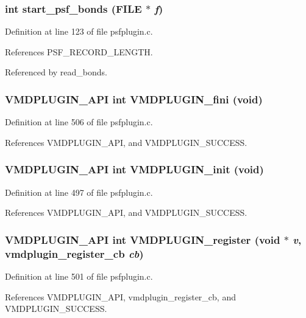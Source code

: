 \subsubsection{\setlength{\rightskip}{0pt plus 5cm}int start\_\-psf\_\-bonds (FILE $\ast$ {\em f})\hspace{0.3cm}{\tt  [static]}}\label{psfplugin_8c_a3}




Definition at line 123 of file psfplugin.c.

References PSF\_\-RECORD\_\-LENGTH.

Referenced by read\_\-bonds.
\subsubsection{\setlength{\rightskip}{0pt plus 5cm}VMDPLUGIN\_\-API int VMDPLUGIN\_\-fini (void)}\label{psfplugin_8c_a15}




Definition at line 506 of file psfplugin.c.

References VMDPLUGIN\_\-API, and VMDPLUGIN\_\-SUCCESS.
\subsubsection{\setlength{\rightskip}{0pt plus 5cm}VMDPLUGIN\_\-API int VMDPLUGIN\_\-init (void)}\label{psfplugin_8c_a13}




Definition at line 497 of file psfplugin.c.

References VMDPLUGIN\_\-API, and VMDPLUGIN\_\-SUCCESS.
\subsubsection{\setlength{\rightskip}{0pt plus 5cm}VMDPLUGIN\_\-API int VMDPLUGIN\_\-register (void $\ast$ {\em v}, {\bf vmdplugin\_\-register\_\-cb} {\em cb})}\label{psfplugin_8c_a14}




Definition at line 501 of file psfplugin.c.

References VMDPLUGIN\_\-API, vmdplugin\_\-register\_\-cb, and VMDPLUGIN\_\-SUCCESS.
